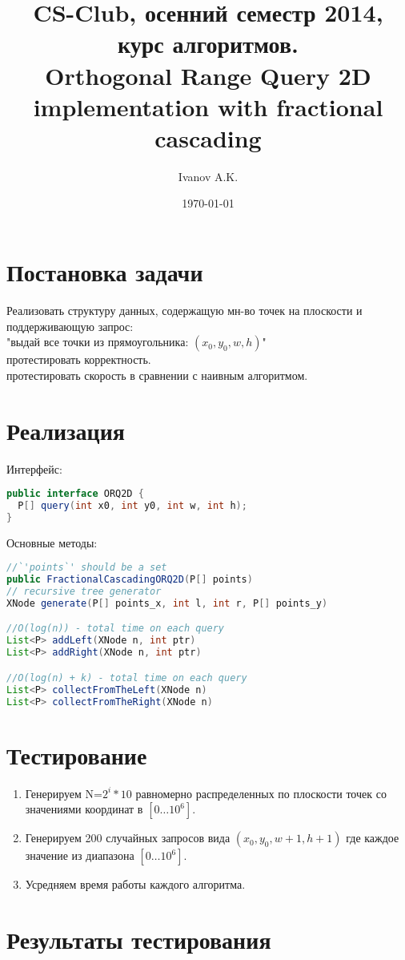 \documentclass[a4paper,12pt]{article}
\title{CS-Club, осенний семестр 2014, курс алгоритмов. \\Orthogonal Range Query 2D implementation with fractional cascading}
\author{Ivanov A.K.}
\date{\today}
\begin{document}
\maketitle

\section{Постановка задачи}
Реализовать структуру данных, содержащую мн-во точек на плоскости и поддерживающую запрос:
\\"выдай все точки из прямоугольника: $(x_0, y_0, w, h)$"
\\протестировать корректность.
\\протестировать скорость в сравнении с наивным алгоритмом.

\section{Реализация}
Интерфейс:
\begin{lstlisting}[language=java]
public interface ORQ2D {
  P[] query(int x0, int y0, int w, int h);
}
\end{lstlisting}
Основные методы:
\begin{lstlisting}[language=java]
//`'points`' should be a set
public FractionalCascadingORQ2D(P[] points) 
// recursive tree generator
XNode generate(P[] points_x, int l, int r, P[] points_y) 

//O(log(n)) - total time on each query
List<P> addLeft(XNode n, int ptr)
List<P> addRight(XNode n, int ptr)

//O(log(n) + k) - total time on each query
List<P> collectFromTheLeft(XNode n)
List<P> collectFromTheRight(XNode n)
\end{lstlisting}
\section{Тестирование}
\begin{enumerate}
\item Генерируем N=$2^i*10$ равномерно распределенных по плоскости точек со значениями координат в  $[0\dots10^6]$.
\item Генерируем 200 случайных запросов вида $(x_0, y_0, w + 1, h + 1)$ где каждое значение из диапазона $[0\dots10^6]$.
\item Усредняем время работы каждого алгоритма.
\end{enumerate}

\section{Результаты тестирования}
\end{document}
